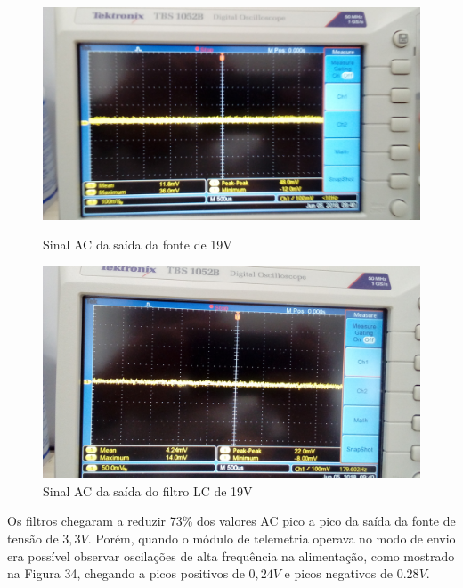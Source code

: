 \documentclass[
	12pt,				%
	openright,			%
	twoside,			%
	a4paper,			%
	english,			%
	french,				%
	spanish,			%
	brazil,				%
	]{abntex2}
\begin{document}
			\begin{figure}[!ht]
				\centering
				\begin{minipage}{0.4\linewidth}
					\centering
					\includegraphics[width = \linewidth]{../Fotos/antesFiltro19.jpg}
					\caption{Sinal AC da saída da fonte de 19V}
				\end{minipage}
				\hfill\vline\hfill
				\begin{minipage}{0.4\linewidth}
					\centering
					\includegraphics[width = \linewidth]{../Fotos/depoisFiltro19.jpg}
					\caption{Sinal AC da saída do filtro LC de 19V}
				\end{minipage}
			\end{figure}

			Os filtros chegaram a reduzir 73\% dos valores AC pico a
			pico da saída da fonte de tensão de $3,3V$. Porém, quando o
			módulo de telemetria operava no modo de envio era possível
			observar oscilações de alta frequência na alimentação, como
			mostrado na Figura 34, chegando a picos positivos de $0,24V$
			e picos negativos de $0.28V$.
			
\end{document}
